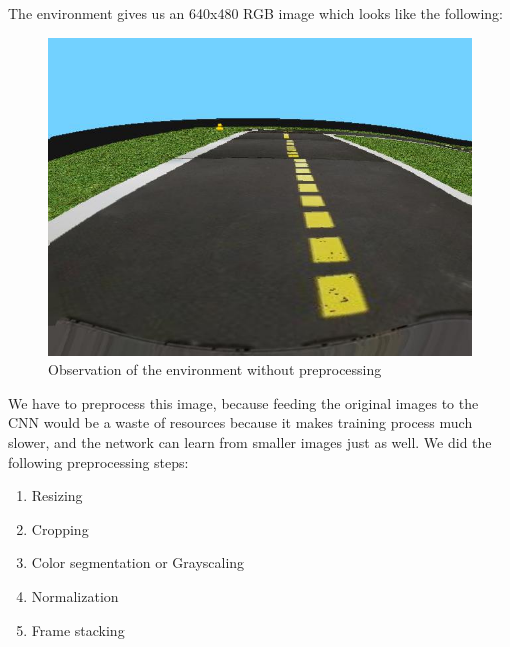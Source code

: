 \documentclass{article}
\begin{document}
The environment gives us an 640x480 RGB image which looks like the following:
\begin{figure}[h!]
	\centering
	\includegraphics[width=0.5\linewidth]{rawobs.jpg}
	\caption{Observation of the environment without preprocessing}
\end{figure}
We have to preprocess this image, because feeding the original images to the CNN would be a waste of resources because it makes training process much slower, and the network can learn from smaller images just as well. We did the following preprocessing steps:
\begin{enumerate}
	\item Resizing
	\item Cropping
	\item Color segmentation or Grayscaling
	\item Normalization
	\item Frame stacking
\end{enumerate}
\end{document}
